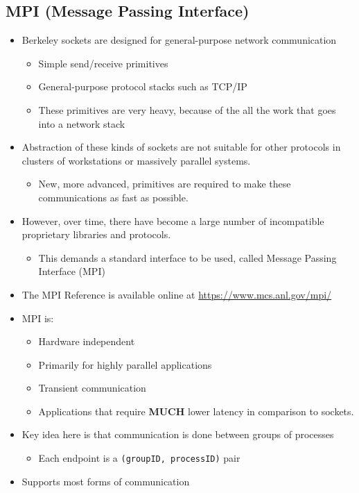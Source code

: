 \subsection{MPI (Message Passing Interface)}\label{subsec:Message_Passing_Interface}
\begin{itemize}[noitemsep]
\item Berkeley sockets are designed for general-purpose network communication
  \begin{itemize}[noitemsep]
  \item Simple send/receive primitives
  \item General-purpose protocol stacks such as TCP/IP
  \item These primitives are very heavy, because of the all the work that goes into a network stack
  \end{itemize}
\item Abstraction of these kinds of sockets are not suitable for other protocols in clusters of workstations or massively parallel systems.
  \begin{itemize}[noitemsep]
  \item New, more advanced, primitives are required to make these communications as fast as possible.
  \end{itemize}
\item However, over time, there have become a large number of incompatible proprietary libraries and protocols.
  \begin{itemize}[noitemsep]
  \item This demands a standard interface to be used, called Message Passing Interface (MPI)
  \end{itemize}
\item The MPI Reference is available online at \url{https://www.mcs.anl.gov/mpi/}
\item MPI is:
  \begin{itemize}[noitemsep]
  \item Hardware independent
  \item Primarily for highly parallel applications
  \item Transient communication
  \item Applications that require \textbf{MUCH} lower latency in comparison to sockets.
  \end{itemize}
\item Key idea here is that communication is done between groups of processes
  \begin{itemize}[noitemsep]
  \item Each endpoint is a \texttt{(groupID, processID)} pair
  \end{itemize}
\item Supports most forms of communication
\end{itemize}

